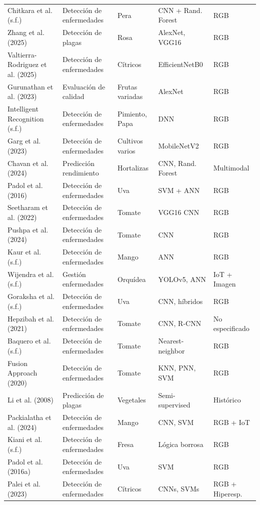 \documentclass[agriculture,article,submit,pdftex,moreauthors]{Definitions/mdpi}
\begin{document}
\begin{footnotesize}
\begin{longtable}{p{3cm} p{2cm} p{2cm} p{2.8cm} p{2cm}}
Chitkara et al. (s.f.) & Detección de enfermedades & Pera & CNN + Rand. Forest & RGB \\
Zhang et al. (2025) & Detección de plagas & Rosa & AlexNet, VGG16 & RGB \\
Valtierra-Rodriguez et al. (2025) & Detección de enfermedades & Cítricos & EfficientNetB0 & RGB \\
Gurunathan et al. (2023) & Evaluación de calidad & Frutas variadas & AlexNet & RGB \\
Intelligent Recognition (s.f.) & Detección de enfermedades & Pimiento, Papa & DNN & RGB \\
Garg et al. (2023) & Detección de enfermedades & Cultivos varios & MobileNetV2 & RGB \\
Chavan et al. (2024) & Predicción rendimiento & Hortalizas & CNN, Rand. Forest & Multimodal \\
Padol et al. (2016) & Detección de enfermedades & Uva & SVM + ANN & RGB \\
Seetharam et al. (2022) & Detección de enfermedades & Tomate & VGG16 CNN & RGB \\
Pushpa et al. (2024) & Detección de enfermedades & Tomate & CNN & RGB \\
Kaur et al. (s.f.) & Detección de enfermedades & Mango & ANN & RGB \\
Wijendra et al. (s.f.) & Gestión enfermedades & Orquídea & YOLOv5, ANN & IoT + Imagen \\
Goraksha et al. (s.f.) & Detección de enfermedades & Uva & CNN, híbridos & RGB \\
Hepzibah et al. (2021) & Detección de enfermedades & Tomate & CNN, R-CNN & No especificado \\
Baquero et al. (s.f.) & Detección de enfermedades & Tomate & Nearest-neighbor & RGB \\
Fusion Approach (2020) & Detección de enfermedades & Tomate & KNN, PNN, SVM & RGB \\
Li et al. (2008) & Predicción de plagas & Vegetales & Semi-supervised & Histórico \\
Packialatha et al. (2024) & Detección de enfermedades & Mango & CNN, SVM & RGB + IoT \\
Kiani et al. (s.f.) & Detección de enfermedades & Fresa & Lógica borrosa & RGB \\
Padol et al. (2016a) & Detección de enfermedades & Uva & SVM & RGB \\
Palei et al. (2023) & Detección de enfermedades & Cítricos & CNNs, SVMs & RGB + Hiperesp. \\

\end{longtable}
\end{footnotesize}
\end{document}
